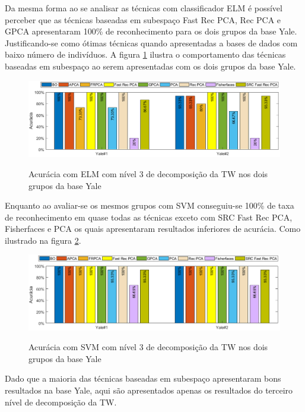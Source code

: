 Da mesma forma ao se analisar as técnicas com classificador ELM é possível perceber que as técnicas baseadas em subespaço Fast Rec PCA, Rec PCA e GPCA apresentaram 100\% de reconhecimento para os dois grupos da base Yale. Justificando-se como ótimas técnicas quando apresentadas a bases de dados com baixo número de indivíduos. A figura \ref{fig:acuracia_yale_subespaco_ELM} ilustra o comportamento das técnicas baseadas em  subespaço ao serem apresentadas com os dois grupos da base Yale.

\begin{figure}[H]
\centering
\caption{Acurácia com ELM com nível 3 de decomposição da TW nos dois grupos da base Yale}
\includegraphics[scale=0.55]{imgs4/acuracia/acuracia_Yale_subespaco_ELM}
\label{fig:acuracia_yale_subespaco_ELM}
\end{figure}


Enquanto ao avaliar-se os mesmos grupos com SVM conseguiu-se 100\% de taxa de reconhecimento em quase todas as técnicas exceto com SRC Fast Rec PCA, Fisherfaces e PCA os quais apresentaram resultados inferiores de acurácia. Como ilustrado na figura \ref{fig:acuracia_yale_subespaco_SVM}.


\begin{figure}[H]
\centering
\caption{Acurácia com SVM com nível 3 de decomposição da TW nos dois grupos da base Yale}
\includegraphics[scale=0.55]{imgs4/acuracia/acuracia_Yale_subespaco_SVM}
\label{fig:acuracia_yale_subespaco_SVM}
\end{figure}

Dado que a maioria das técnicas baseadas em subespaço apresentaram bons resultados na base Yale, aqui são apresentados apenas os resultados do terceiro nível de decomposição da TW.







